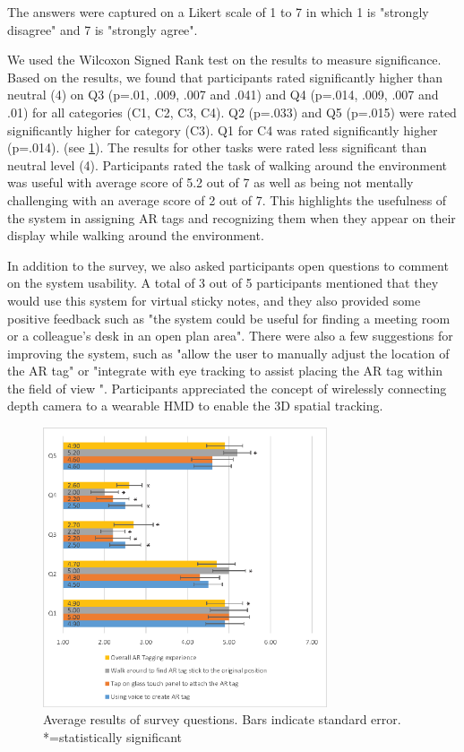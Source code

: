 The answers were captured on a Likert scale of 1 to 7 in which 1 is "strongly disagree" and 7 is "strongly agree".

We used the Wilcoxon Signed Rank test on the results to measure significance. Based on the results, we found that participants rated significantly higher than neutral (4) on Q3 (p=.01, .009, .007 and .041) and Q4 (p=.014, .009, .007 and .01) for all categories (C1, C2, C3, C4). Q2 (p=.033) and Q5 (p=.015) were rated significantly higher for category (C3). Q1 for C4 was rated significantly higher (p=.014). (see \ref{survey_results}). The results  for other tasks were rated less significant than neutral level (4). Participants rated the task of walking around the environment was useful with average score of 5.2 out of 7 as well as being not mentally challenging with an average score of 2 out of 7. This highlights the usefulness of the system in assigning AR tags and recognizing them when they appear on their display while walking around the environment. 

In addition to the survey, we also asked participants open questions to comment on the system usability. A total of 3 out of 5 participants mentioned that they would use this system for virtual sticky notes, and they also provided some positive feedback such as "the system could be useful for finding a meeting room or a colleague's desk in an open plan area". There were also a few suggestions for improving the system, such as "allow the user to manually adjust the location of the AR tag" or "integrate with eye tracking to assist placing the AR tag within the field of view ". Participants appreciated  the concept of wirelessly connecting depth camera to a wearable HMD to enable the 3D spatial tracking.    


\begin{figure}[ht]
  \centering
  \includegraphics[width=3.3in]{images/mgia16/user_study_results2}
  \caption{Average results of survey questions. Bars indicate standard error. *=statistically significant}
	\label{survey_results}
\end{figure}


